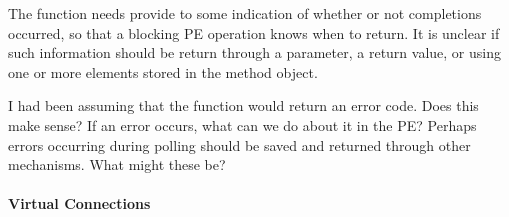 \begin{cmt}
  The  function needs provide to some indication of whether
  or not completions occurred, so that a blocking PE operation knows when to
  return.  It is unclear if such information should be return through a
  parameter, a return value, or using one or more elements stored in the method
  object.
\end{cmt}

\begin{cmt}
  I had been assuming that the  function would return an
  error code.  Does this make sense?  If an error occurs, what can we do about
  it in the PE?  Perhaps errors occurring during polling should be saved and
  returned through other mechanisms.  What might these be?
\end{cmt}


%

\paragraph{Virtual Connections}

% 
% 

